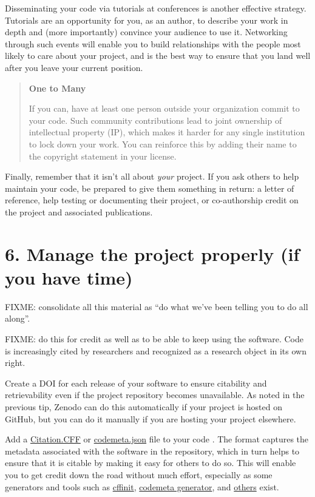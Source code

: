 \documentclass[10pt,letterpaper]{article}
\begin{document}
Disseminating your code via tutorials at conferences is another effective strategy.
Tutorials are an opportunity for you,
as an author,
to describe your work in depth
and (more importantly) convince your audience to use it.
Networking through such events will enable you to build relationships with
the people most likely to care about your project,
and is the best way to ensure that you land well after you leave your current position.

\begin{quote}
  \noindent
  \textbf{One to Many}

  If you can, have at least one person outside your organization commit to your code.
  Such community contributions lead to joint ownership of intellectual property (IP),
  which makes it harder for any single institution to lock down your work.
  You can reinforce this by adding their name to the copyright statement in your license.
\end{quote}

Finally,
remember that it isn't all about \emph{your} project.
If you ask others to help maintain your code,
be prepared to give them something in return:
a letter of reference,
help testing or documenting their project,
or co-authorship credit on the project and associated publications.

\section*{6. Manage the project properly (if you have time)}

FIXME: consolidate all this material as ``do what we've been telling you to do all along''.

FIXME: do this for credit as well as to be able to keep using the software.
Code is increasingly cited by researchers \cite{Smith2016,Katz2021,Garijo2024}
and recognized as a research object in its own right.

Create a DOI for each release of your software
to ensure citability and retrievability even if the project repository becomes unavailable.
As noted in the previous tip,
Zenodo can do this automatically if your project is hosted on GitHub,
but you can do it manually if you are hosting your project elsewhere.

Add a \href{https://citation-file-format.github.io/}{Citation.CFF}
or \href{https://codemeta.github.io}{codemeta.json} file to your code \cite{Druskat2021}.
The format captures the metadata associated with the software in the repository,
which in turn helps to ensure that it is citable by making it easy for others to do so.
This will enable you to get credit down the road without much effort,
especially as some generators and tools
such as \href{https://citation-file-format.github.io/cff-initializer-javascript/}{cffinit},
\href{https://codemeta.github.io/codemeta-generator/}{codemeta generator},
and \href{https://github.com/citation-file-format/citation-file-format/blob/main/README.md\#tools-to-work-with-citationcff-files-wrench}{others} exist.
\end{document}
